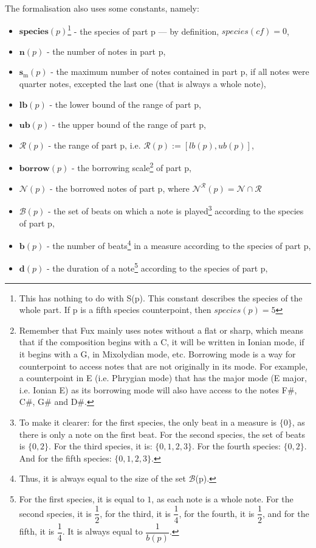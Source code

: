 \noindent The formalisation also uses some constants, namely:
\begin{itemize}
    \item $\textbf{species}(p)$\footnote{This has nothing to do with S(p). This constant describes the species of the whole part. If p is a fifth species counterpoint, then $species(p)=5$} - the species of part p --- by definition, $species(\mathit{cf}) = 0$,
    \item $\textbf{n}(p)$ - the number of notes in part p,
    \item $\textbf{s$_\text{m}$}(p)$ - the maximum number of notes contained in part p, if all notes were quarter notes, excepted the last one (that is always a whole note),
    \item $\textbf{lb}(p)$ - the lower bound of the range of part p,
    \item $\textbf{ub}(p)$ - the upper bound of the range of part p,
    \item $\mathcal{R}(p)$ - the range of part p, i.e. $\mathcal{R}(p) := [lb(p), ub(p)]$,
    \item $\textbf{borrow}(p)$ - the borrowing scale\footnote{Remember that Fux mainly uses notes without a flat or sharp, which means that if the composition begins with a C, it will be written in Ionian mode, if it begins with a G, in Mixolydian mode, etc. Borrowing mode is a way for counterpoint to access notes that are not originally in its mode. For example, a counterpoint in E (i.e. Phrygian mode) that has the major mode (E major, i.e. Ionian E) as its borrowing mode will also have access to the notes F\#, C\#, G\# and D\#.} of part p,
    \item $\mathcal{N}(p)$ - the borrowed notes of part p, where $\mathcal{N}^{\mathcal{R}}(p) = \mathcal{N} \cap \mathcal{R}$
    \item $\mathcal{B}(p)$ - the set of beats on which a note is played\footnote{To make it clearer: for the first species, the only beat in a measure is $\{0\}$, as there is only a note on the first beat. For the second species, the set of beats is $\{0, 2\}$. For the third species, it is: $\{0, 1, 2, 3\}$. For the fourth species: $\{0, 2\}$. And for the fifth species: $\{0, 1, 2, 3\}$.} according to the species of part p,
    \item $\textbf{b}(p)$ - the number of beats\footnote{Thus, it is always equal to the size of the set $\mathcal{B}$(p).} in a measure according to the species of part p,
    \item $\textbf{d}(p)$ - the duration of a note\footnote{For the first species, it is equal to $1$, as each note is a whole note. For the second species, it is $\dfrac{1}{2}$, for the third, it is $\dfrac{1}{4}$, for the fourth, it is $\dfrac{1}{2}$, and for the fifth, it is $\dfrac{1}{4}$. It is always equal to $\dfrac{1}{b(p)}$.} according to the species of part p,

\end{itemize}
